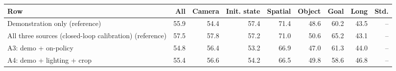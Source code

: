 \begin{tabular}{lrrrrrrrr}
\toprule
Row & All & Camera & Init. state & Spatial & Object & Goal & Long & Std. \\
\midrule
Demonstration only (reference) & 55.9 & 54.4 & 57.4 & 71.4 & 48.6 & 60.2 & 43.5 & -- \\
All three sources (closed-loop calibration) (reference) & 57.5 & 57.8 & 57.2 & 71.0 & 50.6 & 65.2 & 43.1 & -- \\
A3: demo + on-policy & 54.8 & 56.4 & 53.2 & 66.9 & 47.0 & 61.3 & 44.0 & -- \\
A4: demo + lighting + crop & 55.4 & 56.6 & 54.2 & 66.5 & 49.8 & 58.6 & 46.8 & -- \\
\bottomrule
\end{tabular}
